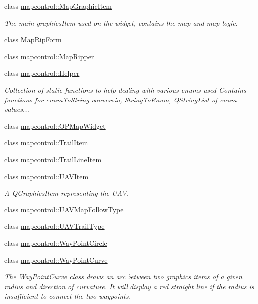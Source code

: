 \begin{DoxyCompactItemize}
\item 
class \hyperlink{classmapcontrol_1_1_map_graphic_item}{mapcontrol\-::\-Map\-Graphic\-Item}
\begin{DoxyCompactList}\small\item\em The main graphics\-Item used on the widget, contains the map and map logic. \end{DoxyCompactList}\item 
class \hyperlink{class_map_rip_form}{Map\-Rip\-Form}
\item 
class \hyperlink{classmapcontrol_1_1_map_ripper}{mapcontrol\-::\-Map\-Ripper}
\item 
class \hyperlink{classmapcontrol_1_1_helper}{mapcontrol\-::\-Helper}
\begin{DoxyCompactList}\small\item\em Collection of static functions to help dealing with various enums used Contains functions for enum\-To\-String conversio, String\-To\-Enum, Q\-String\-List of enum values... \end{DoxyCompactList}\item 
class \hyperlink{classmapcontrol_1_1_o_p_map_widget}{mapcontrol\-::\-O\-P\-Map\-Widget}
\item 
class \hyperlink{classmapcontrol_1_1_trail_item}{mapcontrol\-::\-Trail\-Item}
\item 
class \hyperlink{classmapcontrol_1_1_trail_line_item}{mapcontrol\-::\-Trail\-Line\-Item}
\item 
class \hyperlink{classmapcontrol_1_1_u_a_v_item}{mapcontrol\-::\-U\-A\-V\-Item}
\begin{DoxyCompactList}\small\item\em A Q\-Graphics\-Item representing the U\-A\-V. \end{DoxyCompactList}\item 
class \hyperlink{classmapcontrol_1_1_u_a_v_map_follow_type}{mapcontrol\-::\-U\-A\-V\-Map\-Follow\-Type}
\item 
class \hyperlink{classmapcontrol_1_1_u_a_v_trail_type}{mapcontrol\-::\-U\-A\-V\-Trail\-Type}
\item 
class \hyperlink{classmapcontrol_1_1_way_point_circle}{mapcontrol\-::\-Way\-Point\-Circle}
\item 
class \hyperlink{classmapcontrol_1_1_way_point_curve}{mapcontrol\-::\-Way\-Point\-Curve}
\begin{DoxyCompactList}\small\item\em The \hyperlink{classmapcontrol_1_1_way_point_curve}{Way\-Point\-Curve} class draws an arc between two graphics items of a given radius and direction of curvature. It will display a red straight line if the radius is insufficient to connect the two waypoints. \end{DoxyCompactList}\item 

\end{DoxyCompactItemize}
